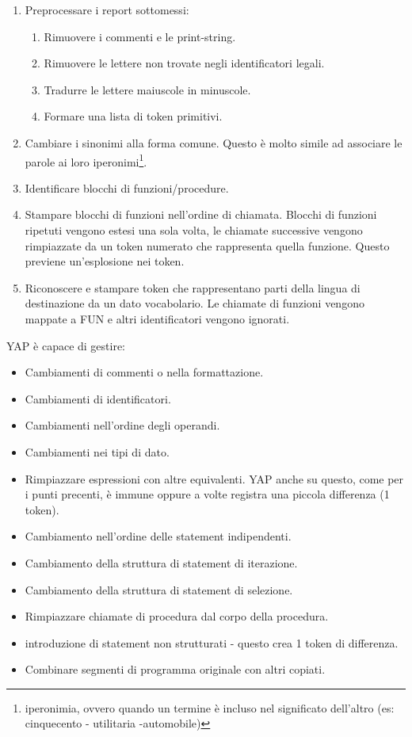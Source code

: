 		\begin{enumerate}
			\item Preprocessare i report sottomessi:
				\begin{enumerate}
					\item Rimuovere i commenti e le print-string.
					\item Rimuovere le lettere non trovate negli identificatori legali.
					\item Tradurre le lettere maiuscole in minuscole.
					\item Formare una lista di token primitivi.
				\end{enumerate}
			\item Cambiare i sinonimi alla forma comune. Questo è molto simile ad associare le parole ai loro iperonimi\footnote{iperonimia, ovvero quando un termine è incluso nel significato dell'altro (es: cinquecento - utilitaria -automobile)}.
			\item Identificare blocchi di funzioni/procedure.
			\item Stampare blocchi di funzioni nell'ordine di chiamata. Blocchi di funzioni ripetuti vengono estesi una sola volta, le chiamate successive vengono rimpiazzate da un token numerato che rappresenta quella funzione. Questo previene un'esplosione nei token.
			\item Riconoscere e stampare token che rappresentano parti della lingua di destinazione da un dato vocabolario. Le chiamate di funzioni vengono mappate a FUN e altri identificatori vengono ignorati.
		\end{enumerate}
		
		YAP è capace di gestire:
		\begin{itemize}
			\item Cambiamenti di commenti o nella formattazione.
			\item Cambiamenti di identificatori.
			\item Cambiamenti nell'ordine degli operandi.
			\item Cambiamenti nei tipi di dato.
			\item Rimpiazzare espressioni con altre equivalenti. YAP anche su questo, come per i punti precenti, è immune oppure a volte registra una piccola differenza (1 token).
			\item Cambiamento nell'ordine delle statement indipendenti.
			\item Cambiamento della struttura di statement di iterazione.
			\item Cambiamento della struttura di statement di selezione.
			\item Rimpiazzare chiamate di procedura dal corpo della procedura.
			\item introduzione di statement non strutturati - questo crea 1 token di differenza.
			\item Combinare segmenti di programma originale con altri copiati.
		\end{itemize}
		
